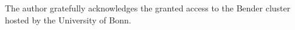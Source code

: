 The author gratefully acknowledges the granted access to the Bender cluster hosted by the University of Bonn.